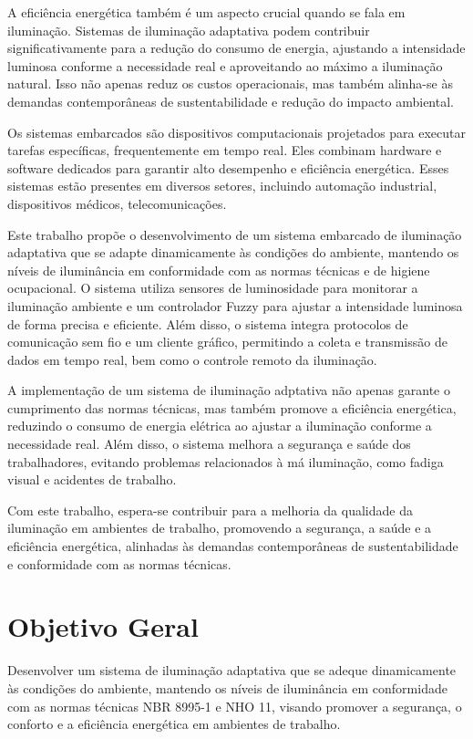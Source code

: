 A eficiência energética também é um aspecto crucial quando se fala em iluminação. Sistemas de iluminação adaptativa podem contribuir significativamente para a redução do consumo de energia, ajustando a intensidade luminosa conforme a necessidade real e aproveitando ao máximo a iluminação natural. Isso não apenas reduz os custos operacionais, mas também alinha-se às demandas contemporâneas de sustentabilidade e redução do impacto ambiental.

Os sistemas embarcados são dispositivos computacionais projetados para executar tarefas específicas, frequentemente em tempo real. Eles combinam hardware e software dedicados para garantir alto desempenho e eficiência energética. Esses sistemas estão presentes em diversos setores, incluindo automação industrial, dispositivos médicos, telecomunicações.

Este trabalho propõe o desenvolvimento de um sistema embarcado de iluminação adaptativa que se adapte dinamicamente às condições do ambiente, mantendo os níveis de iluminância em conformidade com as normas técnicas e de higiene ocupacional. O sistema utiliza sensores de luminosidade para monitorar a iluminação ambiente e um controlador Fuzzy para ajustar a intensidade luminosa de forma precisa e eficiente. Além disso, o sistema integra protocolos de comunicação sem fio e um cliente gráfico, permitindo a coleta e transmissão de dados em tempo real, bem como o controle remoto da iluminação.

A implementação de um sistema de iluminação adptativa não apenas garante o cumprimento das normas técnicas, mas também promove a eficiência energética, reduzindo o consumo de energia elétrica ao ajustar a iluminação conforme a necessidade real. Além disso, o sistema melhora a segurança e saúde dos trabalhadores, evitando problemas relacionados à má iluminação, como fadiga visual e acidentes de trabalho.

Com este trabalho, espera-se contribuir para a melhoria da qualidade da iluminação em ambientes de trabalho, promovendo a segurança, a saúde e a eficiência energética, alinhadas às demandas contemporâneas de sustentabilidade e conformidade com as normas técnicas.

% 
% 
\section{Objetivo Geral}

Desenvolver um sistema de iluminação adaptativa que se adeque dinamicamente às condições do ambiente, mantendo os níveis de iluminância em conformidade com as normas técnicas \gls{NBR} 8995-1 e \gls{NHO} 11, visando promover a segurança, o conforto e a eficiência energética em ambientes de trabalho.
    

